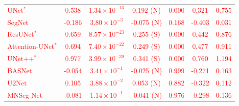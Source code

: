 \documentclass[12pt,letterpaper]{article}
\begin{document}
\begin{enumerate}
\begin{table}[H]
{\begin{tabular}{lcccccc}
\textcolor{red}{UNet$^{*}$} 
& \textcolor{red}{0.538} 
& \textcolor{red}{$1.34 \times 10^{-13}$} 
& \textcolor{red}{0.192 (N)} 
& \textcolor{red}{0.000} 
& \textcolor{red}{0.321} 
& \textcolor{red}{0.755} \\

\textcolor{red}{SegNet} 
& \textcolor{red}{-0.186} 
& \textcolor{red}{$3.80 \times 10^{-3}$} 
& \textcolor{red}{-0.075 (N)} 
& \textcolor{red}{0.168} 
& \textcolor{red}{-0.403} 
& \textcolor{red}{0.031} \\

\textcolor{red}{ResUNet$^{*}$} 
& \textcolor{red}{0.659} 
& \textcolor{red}{$8.57 \times 10^{-23}$} 
& \textcolor{red}{0.255 (S)} 
& \textcolor{red}{0.000} 
& \textcolor{red}{0.442} 
& \textcolor{red}{0.876} \\

\textcolor{red}{Attention-UNet$^{*}$} 
& \textcolor{red}{0.694} 
& \textcolor{red}{$7.40 \times 10^{-22}$} 
& \textcolor{red}{0.249 (S)} 
& \textcolor{red}{0.000} 
& \textcolor{red}{0.477} 
& \textcolor{red}{0.911} \\

\textcolor{red}{UNet++$^{*}$} 
& \textcolor{red}{0.977} 
& \textcolor{red}{$3.99 \times 10^{-39}$} 
& \textcolor{red}{0.341 (S)} 
& \textcolor{red}{0.000} 
& \textcolor{red}{0.760} 
& \textcolor{red}{1.194} \\

\textcolor{red}{BASNet} 
& \textcolor{red}{-0.054} 
& \textcolor{red}{$3.41 \times 10^{-1}$} 
& \textcolor{red}{-0.025 (N)} 
& \textcolor{red}{0.999} 
& \textcolor{red}{-0.271} 
& \textcolor{red}{0.163} \\

\textcolor{red}{U2Net} 
& \textcolor{red}{0.105} 
& \textcolor{red}{$3.88 \times 10^{-2}$} 
& \textcolor{red}{0.053 (N)} 
& \textcolor{red}{0.882} 
& \textcolor{red}{-0.322} 
& \textcolor{red}{0.112} \\

\textcolor{red}{MNSeg-Net} 
& \textcolor{red}{-0.081} 
& \textcolor{red}{$1.14 \times 10^{-1}$} 
& \textcolor{red}{-0.041 (N)} 
& \textcolor{red}{0.976} 
& \textcolor{red}{-0.298} 
& \textcolor{red}{0.136} \\

\hline
\end{tabular}}
\label{tab:stats_analysis_on_old_data_csa}

\end{table}































\end{enumerate}
\end{document}

